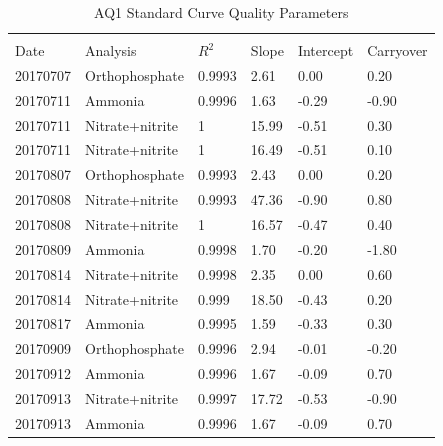 \begin{center}
\begin{table}[]
	\caption{AQ1 Standard Curve Quality Parameters}
	\label{tab:aq1}
	\begin{center}
\begin{tabular}{llllll} 
	\hline \\
Date     & Analysis 		& $R^2$  & Slope & Intercept & Carryover \\ 
20170707 & Orthophosphate 	& 0.9993 & 2.61  & 0.00      & 0.20      \\
20170711 & Ammonia  		& 0.9996 & 1.63  & -0.29     & -0.90     \\
20170711 & Nitrate+nitrite 	& 1      & 15.99 & -0.51     & 0.30      \\
20170711 & Nitrate+nitrite 	& 1      & 16.49 & -0.51     & 0.10      \\
20170807 & Orthophosphate 	& 0.9993 & 2.43  & 0.00      & 0.20      \\
20170808 & Nitrate+nitrite 	& 0.9993 & 47.36 & -0.90     & 0.80      \\
20170808 & Nitrate+nitrite	& 1      & 16.57 & -0.47     & 0.40      \\
20170809 & Ammonia   		& 0.9998 & 1.70  & -0.20     & -1.80     \\
20170814 & Nitrate+nitrite 	& 0.9998 & 2.35  & 0.00      & 0.60      \\
20170814 & Nitrate+nitrite 	& 0.999  & 18.50 & -0.43     & 0.20      \\
20170817 & Ammonia  		& 0.9995 & 1.59  & -0.33     & 0.30      \\
20170909 & Orthophosphate 	& 0.9996 & 2.94  & -0.01     & -0.20     \\
20170912 & Ammonia  		& 0.9996 & 1.67  & -0.09     & 0.70      \\
20170913 & Nitrate+nitrite 	& 0.9997 & 17.72 & -0.53     & -0.90     \\
20170913 & Ammonia 		& 0.9996 & 1.67  & -0.09     & 0.70      \\ \hline      
\end{tabular}
\end{center}
\end{table}


\end{center}
